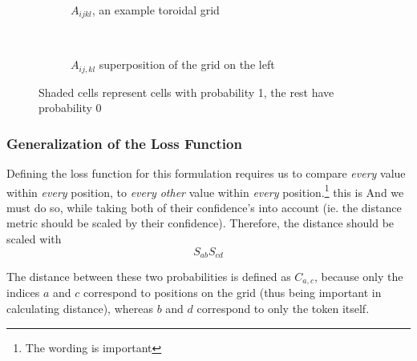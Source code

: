 \begin{figure}[htpb]
    \centering
    \begin{subfigure}[t]{0.5\textwidth}
    \begin{center}
    \end{center}
    \caption{$A_{ijkl}$, an example toroidal grid}
    \end{subfigure}%
    ~
    \begin{subfigure}[t]{0.5\textwidth}
    \begin{center}
    \end{center}
    \caption{$A_{ij,kl}$ superposition of the grid on the left}
    \end{subfigure}

    \caption{Shaded cells represent cells with probability 1, the rest have probability 0}
    \label{fig:superpositionExample}
\end{figure}

\subsubsection{Generalization of the Loss Function}%
\label{ssub:generalization_of_the_loss_function}

Defining the loss function for this formulation requires us to compare \emph{every} value within \emph{every} position, to \emph{every other} value within \emph{every} position.\footnote{The wording is important} this is  And we must do so, while taking both of their confidence's into account (ie. the distance metric should be scaled by their confidence). Therefore, the distance should be scaled with
\begin{equation}
    S_{ab}S_{cd}
\end{equation}

The distance between these two probabilities is defined as $C_{a,c}$, because only the indices $a$ and $c$ correspond to positions on the grid (thus being important in calculating distance), whereas $b$ and $d$ correspond to only the token itself.

